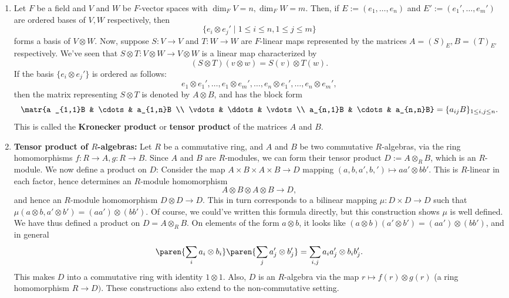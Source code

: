 \begin{ex}
    \begin{enumerate}
        \item Let $F$ be a field and $V$ and $W$ be $F$-vector spaces with $\dim_F V=n,\dim _FW = m$. Then, if $E := (e_1,\dots,e_n)$ and $E' := (e_1',\dots,e_m')$ are ordered bases of $V,W$ respectively, then
        $$\{ e_i \otimes e_j' \mid 1 \leq i \leq n, 1 \leq j \leq m\}$$
        forms a basis of $V \otimes W$. Now, suppose $S:V \to V$ and $T:W \to W$ are $F$-linear maps represented by the matrices $A=(S)_E,B = (T)_{E'}$ respectively. We've seen that $S \otimes T : V \otimes W \to V \otimes W$ is a linear map characterized by
        $$(S \otimes T)(v \otimes w)= S(v) \otimes T(w).$$
        If the basis $\{ e_i \otimes e_j'\}$ is ordered as follows:
        $$e_1\otimes e_1',\dots,e_1 \otimes e_m',\dots,e_n \otimes e_1',\dots,e_n\otimes e_m',$$
        then the matrix representing $S \otimes T$ is denoted by $A \otimes B$, and has the block form
        $$\matr{a _{1,1}B & \cdots & a_{1,n}B \\ \vdots & \ddots & \vdots \\ a_{n,1}B & \cdots & a_{n,n}B}=\{ a_{ij}B\}_{1\leq i,j \leq n}.$$
        This is called the \textbf{Kronecker product} or \textbf{tensor product} of the matrices $A$ and $B$.
        \item \textbf{Tensor product of $R$-algebras:} Let $R$ be a commutative ring, and $A$ and $B$ be two commutative $R$-algebras, via the ring homomorphisms $f:R \to A,g : R \to B$. Since $A$ and $B$ are $R$-modules, we can form their tensor product $ D:=A \otimes _R B$, which is an $R$-module. We now define a product on $D$: Consider the map $A \times B \times A \times B \to D$ mapping $(a,b,a',b,') \mapsto aa' \otimes bb'$. This is $R$-linear in each factor, hence determines an $R$-module homomorphism
        $$A \otimes B \otimes A \otimes B \to D,$$
        and hence an $R$-module homomorphism $D \otimes D \to D$. This in turn corresponds to a bilinear mapping $\mu : D \times D \to D$ such that $\mu (a \otimes b, a' \otimes b') = (aa')\otimes (bb')$. Of course, we could've written this formula directly, but this construction shows $\mu$ is well defined. We have thus defined a product on $D = A \otimes _R B$. On elements of the form $a \otimes b$, it looks like $(a \otimes b)(a' \otimes b') = (a a') \otimes (bb')$, and in general
        $$\paren{\sum_i a_i \otimes b_i}\paren{\sum_j a_j' \otimes b_j'}= \sum_{i,j} a_ia_j' \otimes b_ib_j'.$$
        This makes $D$ into a commutative ring with identity $1 \otimes 1$. Also, $D$ is an $R$-algebra via the map $r \mapsto f(r) \otimes g(r)$ (a ring homomorphism $R \to D)$. These constructions  also extend to the non-commutative setting.
    \end{enumerate}
\end{ex}

